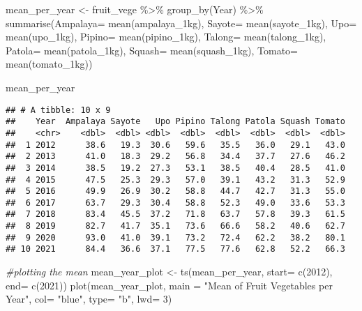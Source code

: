 \documentclass[
]{article}
\newenvironment{Shaded}{\begin{snugshade}}{\end{snugshade}}
\newcommand{\AttributeTok}[1]{\textcolor[rgb]{0.77,0.63,0.00}{#1}}
\newcommand{\CommentTok}[1]{\textcolor[rgb]{0.56,0.35,0.01}{\textit{#1}}}
\newcommand{\DecValTok}[1]{\textcolor[rgb]{0.00,0.00,0.81}{#1}}
\newcommand{\FunctionTok}[1]{\textcolor[rgb]{0.00,0.00,0.00}{#1}}
\newcommand{\NormalTok}[1]{#1}
\newcommand{\OtherTok}[1]{\textcolor[rgb]{0.56,0.35,0.01}{#1}}
\newcommand{\SpecialCharTok}[1]{\textcolor[rgb]{0.00,0.00,0.00}{#1}}
\newcommand{\StringTok}[1]{\textcolor[rgb]{0.31,0.60,0.02}{#1}}
\begin{document}
\begin{Shaded}
\begin{Highlighting}[]
\NormalTok{mean\_per\_year }\OtherTok{\textless{}{-}}\NormalTok{ fruit\_vege }\SpecialCharTok{\%\textgreater{}\%} \FunctionTok{group\_by}\NormalTok{(Year) }\SpecialCharTok{\%\textgreater{}\%} \FunctionTok{summarise}\NormalTok{(}\AttributeTok{Ampalaya=} \FunctionTok{mean}\NormalTok{(ampalaya\_1kg), }\AttributeTok{Sayote=} \FunctionTok{mean}\NormalTok{(sayote\_1kg), }\AttributeTok{Upo=} \FunctionTok{mean}\NormalTok{(upo\_1kg), }\AttributeTok{Pipino=} \FunctionTok{mean}\NormalTok{(pipino\_1kg), }\AttributeTok{Talong=} \FunctionTok{mean}\NormalTok{(talong\_1kg), }\AttributeTok{Patola=} \FunctionTok{mean}\NormalTok{(patola\_1kg), }\AttributeTok{Squash=} \FunctionTok{mean}\NormalTok{(squash\_1kg), }\AttributeTok{Tomato=} \FunctionTok{mean}\NormalTok{(tomato\_1kg))}

\NormalTok{mean\_per\_year}
\end{Highlighting}
\end{Shaded}

\begin{verbatim}
## # A tibble: 10 x 9
##    Year  Ampalaya Sayote   Upo Pipino Talong Patola Squash Tomato
##    <chr>    <dbl>  <dbl> <dbl>  <dbl>  <dbl>  <dbl>  <dbl>  <dbl>
##  1 2012      38.6   19.3  30.6   59.6   35.5   36.0   29.1   43.0
##  2 2013      41.0   18.3  29.2   56.8   34.4   37.7   27.6   46.2
##  3 2014      38.5   19.2  27.3   53.1   38.5   40.4   28.5   41.0
##  4 2015      47.5   25.3  29.3   57.0   39.1   43.2   31.3   52.9
##  5 2016      49.9   26.9  30.2   58.8   44.7   42.7   31.3   55.0
##  6 2017      63.7   29.3  30.4   58.8   52.3   49.0   33.6   53.3
##  7 2018      83.4   45.5  37.2   71.8   63.7   57.8   39.3   61.5
##  8 2019      82.7   41.7  35.1   73.6   66.6   58.2   40.6   62.7
##  9 2020      93.0   41.0  39.1   73.2   72.4   62.2   38.2   80.1
## 10 2021      84.4   36.6  37.1   77.5   77.6   62.8   52.2   66.3
\end{verbatim}

\begin{Shaded}
\begin{Highlighting}[]
\CommentTok{\#plotting the mean}
\NormalTok{mean\_year\_plot }\OtherTok{\textless{}{-}} \FunctionTok{ts}\NormalTok{(mean\_per\_year, }\AttributeTok{start=} \FunctionTok{c}\NormalTok{(}\DecValTok{2012}\NormalTok{), }\AttributeTok{end=} \FunctionTok{c}\NormalTok{(}\DecValTok{2021}\NormalTok{))}
\FunctionTok{plot}\NormalTok{(mean\_year\_plot, }\AttributeTok{main =} \StringTok{"Mean of Fruit Vegetables per Year"}\NormalTok{,}
     \AttributeTok{col=} \StringTok{"blue"}\NormalTok{, }\AttributeTok{type=} \StringTok{"b"}\NormalTok{, }\AttributeTok{lwd=} \DecValTok{3}\NormalTok{)}
\end{Highlighting}
\end{Shaded}
\end{document}

